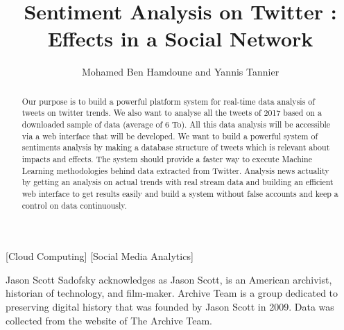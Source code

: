\documentclass{acmtog} %
\begin{document}

\title{Sentiment Analysis on Twitter : Effects in a Social Network} %

\author{Mohamed Ben Hamdoune {\upshape and} Yannis Tannier
}

[Cloud Computing]
[Social Media Analytics]




\maketitle

\begin{bottomstuff}
Jason Scott Sadofsky acknowledges as Jason Scott, is an American archivist, historian of technology, and film-maker. Archive Team is a group dedicated to preserving digital history that was founded by Jason Scott in 2009. Data was collected from the website of The Archive Team.
\end{bottomstuff}


\begin{abstract}

Our purpose is to build a powerful platform system for real-time data analysis of tweets on twitter trends. We also want to analyse all the tweets of 2017 based on a downloaded sample of data (average of 6 To). All this data analysis will be accessible via a web interface that will be developed. We want to build a powerful system of sentiments analysis by making a database structure of tweets which is relevant about impacts and effects. The system should provide a faster way to execute Machine Learning methodologies behind data extracted from Twitter. Analysis news actuality by getting an analysis on actual trends with real stream data and building an efficient web interface to get results easily and build a system without false accounts and keep a control on data continuously.
\end{abstract}
\end{document}
